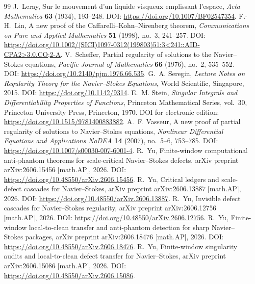 \documentclass[10pt,a4paper]{amsart}
\numberwithin{equation}{section}
\begin{document}
\begin{thebibliography}{99}
 J.~Leray, \newblock Sur le mouvement d'un liquide visqueux emplissant l'espace, \newblock \emph{Acta Mathematica} \textbf{63} (1934), 193--248. \newblock DOI: \url{https://doi.org/10.1007/BF02547354}.
 F.-H.~Lin, \newblock A new proof of the Caffarelli--Kohn--Nirenberg theorem, \newblock \emph{Communications on Pure and Applied Mathematics} \textbf{51} (1998), no.~3, 241--257. \newblock DOI: \url{https://doi.org/10.1002/(SICI)1097-0312(199803)51:3<241::AID-CPA2>3.0.CO;2-A}.
 V.~Scheffer, \newblock Partial regularity of solutions to the Navier--Stokes equations, \newblock \emph{Pacific Journal of Mathematics} \textbf{66} (1976), no.~2, 535--552. \newblock DOI: \url{https://doi.org/10.2140/pjm.1976.66.535}.
 G.~A. Seregin, \newblock \emph{Lecture Notes on Regularity Theory for the Navier--Stokes Equations}, \newblock World Scientific, Singapore, 2015. \newblock DOI: \url{https://doi.org/10.1142/9314}.
 E.~M. Stein, \newblock \emph{Singular Integrals and Differentiability Properties of Functions}, \newblock Princeton Mathematical Series, vol.~30, Princeton University Press, Princeton, 1970. \newblock DOI for electronic edition: \url{https://doi.org/10.1515/9781400883882}.
 A.~F. Vasseur, \newblock A new proof of partial regularity of solutions to Navier--Stokes equations, \newblock \emph{Nonlinear Differential Equations and Applications NoDEA} \textbf{14} (2007), no.~5--6, 753--785. \newblock DOI: \url{https://doi.org/10.1007/s00030-007-6001-4}.
 R.~Yu, \newblock Finite-window computational anti-phantom theorems for scale-critical Navier--Stokes defects, \newblock arXiv preprint arXiv:2606.15456 [math.AP], 2026. \newblock DOI: \url{https://doi.org/10.48550/arXiv.2606.15456}.
 R.~Yu, \newblock Critical ledgers and scale-defect cascades for Navier--Stokes, \newblock arXiv preprint arXiv:2606.13887 [math.AP], 2026. \newblock DOI: \url{https://doi.org/10.48550/arXiv.2606.13887}.
 R.~Yu, \newblock Invisible defect cascades for Navier--Stokes regularity, \newblock arXiv preprint arXiv:2606.12756 [math.AP], 2026. \newblock DOI: \url{https://doi.org/10.48550/arXiv.2606.12756}.
 R.~Yu, \newblock Finite-window local-to-clean transfer and anti-phantom detection for sharp Navier--Stokes packages, \newblock arXiv preprint arXiv:2606.18476 [math.AP], 2026. \newblock DOI: \url{https://doi.org/10.48550/arXiv.2606.18476}.
 R.~Yu, \newblock Finite-window singularity audits and local-to-clean defect transfer for Navier--Stokes, \newblock arXiv preprint arXiv:2606.15086 [math.AP], 2026. \newblock DOI: \url{https://doi.org/10.48550/arXiv.2606.15086}.
\end{thebibliography}
\end{document}
